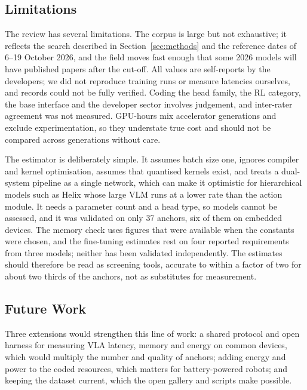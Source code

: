 \documentclass[applsci,review,submit,pdftex,oneauthor]{Definitions/mdpi}
\begin{document}
\subsection{Limitations}

The review has several limitations. The corpus is large but not exhaustive; it reflects the search described in Section~\ref{sec:methods} and the reference dates of 6--19 October 2026, and the field moves fast enough that some 2026 models will have published papers after the cut-off. All values are self-reports by the developers; we did not reproduce training runs or measure latencies ourselves, and \nUnverified{} records could not be fully verified. Coding the head family, the RL category, the base interface and the developer sector involves judgement, and inter-rater agreement was not measured. GPU-hours mix accelerator generations and exclude experimentation, so they understate true cost and should not be compared across generations without care.

The estimator is deliberately simple. It assumes batch size one, ignores compiler and kernel optimisation, assumes that quantised kernels exist, and treats a dual-system pipeline as a single network, which can make it optimistic for hierarchical models such as Helix whose large VLM runs at a lower rate than the action module. It needs a parameter count and a head type, so \nNotAssessable{} models cannot be assessed, and it was validated on only 37 anchors, six of them on embedded devices. The memory check uses figures that were available when the constants were chosen, and the fine-tuning estimates rest on four reported requirements from three models; neither has been validated independently. The estimates should therefore be read as screening tools, accurate to within a factor of two for about two thirds of the anchors, not as substitutes for measurement.

\subsection{Future Work}

Three extensions would strengthen this line of work: a shared protocol and open harness for measuring VLA latency, memory and energy on common devices, which would multiply the number and quality of anchors; adding energy and power to the coded resources, which matters for battery-powered robots; and keeping the dataset current, which the open gallery and scripts make possible.

\end{document}

